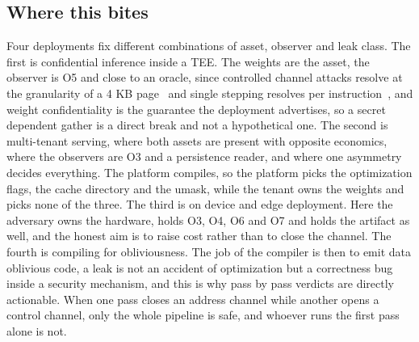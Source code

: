 \subsection{Where this bites}
\label{sec:threat:deployments}
Four deployments fix different combinations of asset, observer and leak class.
The first is confidential inference inside a TEE.
The weights are the asset, the observer is O5 and close to an oracle, since controlled channel attacks resolve at the granularity of a 4 KB page~\cite{xu2015controlled} and single stepping resolves per instruction~\cite{vanbulck2017sgxstep}, and weight confidentiality is the guarantee the deployment advertises, so a secret dependent gather is a direct break and not a hypothetical one.
The second is multi-tenant serving, where both assets are present with opposite economics, where the observers are O3 and a persistence reader, and where one asymmetry decides everything.
The platform compiles, so the platform picks the optimization flags, the cache directory and the umask, while the tenant owns the weights and picks none of the three.
The third is on device and edge deployment.
Here the adversary owns the hardware, holds O3, O4, O6 and O7 and holds the artifact as well, and the honest aim is to raise cost rather than to close the channel.
The fourth is compiling for obliviousness.
The job of the compiler is then to emit data oblivious code, a leak is not an accident of optimization but a correctness bug inside a security mechanism, and this is why pass by pass verdicts are directly actionable.
When one pass closes an address channel while another opens a control channel, only the whole pipeline is safe, and whoever runs the first pass alone is not.
